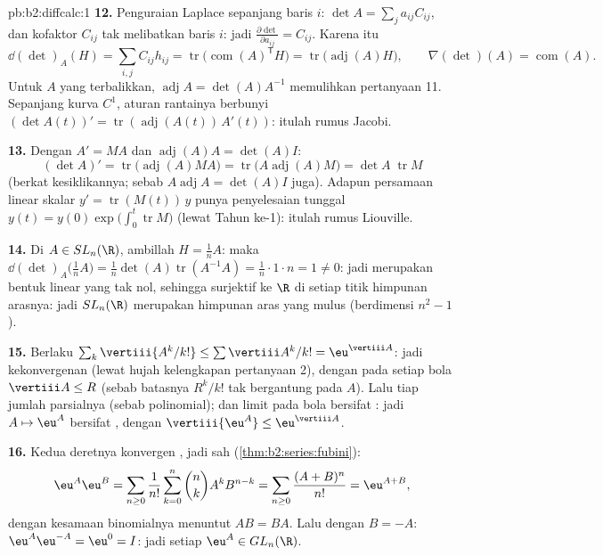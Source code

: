 \begin{solution}{pb:b2:diffcalc:1}
\textbf{12.} Penguraian Laplace sepanjang baris $i$: $\det A =
\sum_j a_{ij}C_{ij}$, dan kofaktor $C_{ij}$ tak melibatkan
baris $i$: jadi $\frac{\partial\det}{\partial a_{ij}} = C_{ij}$. Karena itu
\[
\dd(\det)_A(H) = \sum_{i,j}C_{ij}h_{ij}
= \operatorname{tr}\bigl(\operatorname{com}(A)^{\mathsf T}
H\bigr)
= \operatorname{tr}\bigl(\operatorname{adj}(A)H\bigr),
\qquad
\nabla(\det)(A) = \operatorname{com}(A) .
\]
Untuk $A$ yang terbalikkan, $\operatorname{adj}A = \det(A)A^{-1}$
memulihkan pertanyaan 11. Sepanjang kurva $C^1$, aturan rantainya berbunyi
$(\det A(t))' = \operatorname{tr}(\operatorname{adj}
(A(t))\,A'(t))$: itulah rumus Jacobi.

\textbf{13.} Dengan $A' = MA$ dan
$\operatorname{adj}(A)A = \det(A)I$:
\[
(\det A)' = \operatorname{tr}\bigl(\operatorname{adj}(A)MA
\bigr)
= \operatorname{tr}\bigl(A\operatorname{adj}(A)M\bigr)
= \det A\;\operatorname{tr}M
\]
(berkat kesiklikannya; sebab $A\operatorname{adj}A = \det(A) I$ juga). Adapun
persamaan  linear skalar $y' = \operatorname{tr}(M(t))\,y$ punya
penyelesaian tunggal $y(t) = y(0)\exp\bigl(\int_0^t
\operatorname{tr}M\bigr)$ (lewat Tahun ke-1): itulah rumus Liouville.

\textbf{14.} Di $A \in SL_n(\R)$, ambillah $H = \frac1nA$: maka
$\dd(\det)_A\bigl(\tfrac1nA\bigr) = \frac1n\det(A)
\operatorname{tr}(A^{-1}A) = \frac1n\cdot1\cdot n = 1 \neq 0$:
jadi  merupakan bentuk linear yang tak nol, sehingga surjektif
ke $\R$ di setiap titik himpunan arasnya: jadi $SL_n(\R)$ merupakan
himpunan aras yang mulus (berdimensi $n^2 - 1$).

\textbf{15.} Berlaku $\sum_k\vertiii{A^k/k!} \leq
\sum\vertiii A^k/k! = \eu^{\vertiii A}$: jadi kekonvergenan 
(lewat hujah kelengkapan pertanyaan 2), dengan 
pada setiap bola $\vertiii A \leq R$ (sebab batasnya $R^k/k!$ tak bergantung
pada $A$). Lalu tiap jumlah parsialnya  (sebab polinomial); dan
limit  pada bola bersifat : jadi $A \mapsto \eu^A$ bersifat
, dengan $\vertiii{\eu^A} \leq \eu^{\vertiii A}$.

\textbf{16.} Kedua deretnya konvergen , jadi  sah (\cref{thm:b2:series:fubini}):
\[
\eu^A\eu^B = \sum_{n\geq0}\frac{1}{n!}\sum_{k=0}^n\binom
nkA^kB^{n-k}
= \sum_{n\geq0}\frac{(A+B)^n}{n!} = \eu^{A+B},
\]
dengan kesamaan binomialnya menuntut $AB = BA$. Lalu dengan $B = -A$:
$\eu^A\eu^{-A} = \eu^0 = I$: jadi setiap $\eu^A \in GL_n(\R)$.


\end{solution}

